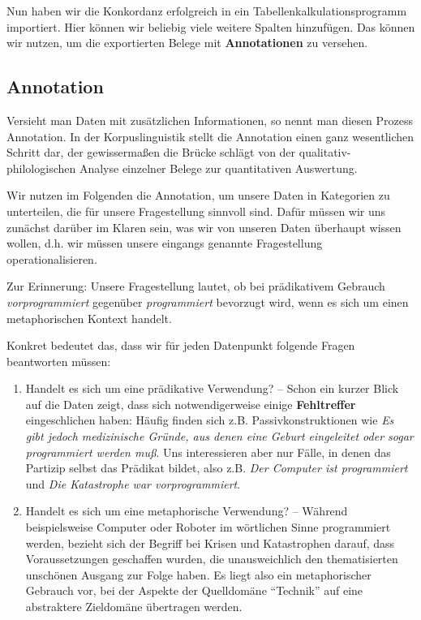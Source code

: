 \documentclass[]{article}
\begin{document}
Nun haben wir die Konkordanz erfolgreich in ein
Tabellenkalkulationsprogramm importiert. Hier können wir beliebig viele
weitere Spalten hinzufügen. Das können wir nutzen, um die exportierten
Belege mit \textbf{Annotationen} zu versehen.

\subsection{Annotation}\label{annotation}

Versieht man Daten mit zusätzlichen Informationen, so nennt man diesen
Prozess Annotation. In der Korpuslinguistik stellt die Annotation einen
ganz wesentlichen Schritt dar, der gewissermaßen die Brücke schlägt von
der qualitativ-philologischen Analyse einzelner Belege zur quantitativen
Auswertung.

Wir nutzen im Folgenden die Annotation, um unsere Daten in Kategorien zu
unterteilen, die für unsere Fragestellung sinnvoll sind. Dafür müssen
wir uns zunächst darüber im Klaren sein, was wir von unseren Daten
überhaupt wissen wollen, d.h. wir müssen unsere eingangs genannte
Fragestellung operationalisieren.

Zur Erinnerung: Unsere Fragestellung lautet, ob bei prädikativem
Gebrauch \emph{vorprogrammiert} gegenüber \emph{programmiert} bevorzugt
wird, wenn es sich um einen metaphorischen Kontext handelt.

Konkret bedeutet das, dass wir für jeden Datenpunkt folgende Fragen
beantworten müssen:

\begin{enumerate}
\def\labelenumi{\arabic{enumi}.}
\item
  Handelt es sich um eine prädikative Verwendung? -- Schon ein kurzer
  Blick auf die Daten zeigt, dass sich notwendigerweise einige
  \textbf{Fehltreffer} eingeschlichen haben: Häufig finden sich z.B.
  Passivkonstruktionen wie \emph{Es gibt jedoch medizinische Gründe, aus
  denen eine Geburt eingeleitet oder sogar programmiert werden muß}. Uns
  interessieren aber nur Fälle, in denen das Partizip selbst das
  Prädikat bildet, also z.B. \emph{Der Computer ist programmiert} und
  \emph{Die Katastrophe war vorprogrammiert}.
\item
  Handelt es sich um eine metaphorische Verwendung? -- Während
  beispielsweise Computer oder Roboter im wörtlichen Sinne programmiert
  werden, bezieht sich der Begriff bei Krisen und Katastrophen darauf,
  dass Voraussetzungen geschaffen wurden, die unausweichlich den
  thematisierten unschönen Ausgang zur Folge haben. Es liegt also ein
  metaphorischer Gebrauch vor, bei der Aspekte der Quelldomäne
  \enquote{Technik} auf eine abstraktere Zieldomäne übertragen werden.
\end{enumerate}
\end{document}
